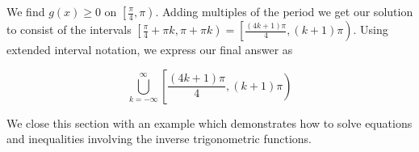 {\begin{enumerate}
We find $g(x) \geq 0$ on $\left[\frac{\pi}{4}, \pi \right)$.  Adding multiples of the period we get our solution to consist of the intervals  $\left[\frac{\pi}{4} + \pi k, \pi + \pi k  \right) = \left[\frac{(4k+1)\pi}{4}, (k+1)\pi \right)$.  Using extended interval notation, we express our final answer as

\[\bigcup_{k = -\infty}^{\infty} \left[\dfrac{(4k+1)\pi}{4}, (k+1)\pi \right)\]



\end{enumerate}
}

\pagebreak

We close this section with an example which demonstrates how to solve equations and inequalities involving the inverse trigonometric functions.

\medskip

